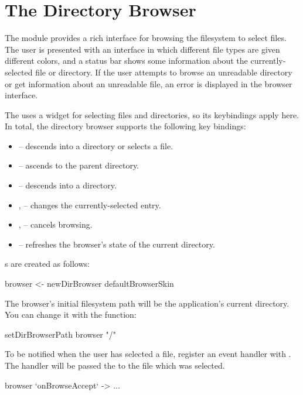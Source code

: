 \section{The Directory Browser}
\label{sec:dirbrowser}

The  module provides a rich interface for browsing the
filesystem to select files.  The user is presented with an interface
in which different file types are given different colors, and a status
bar shows some information about the currently-selected file or
directory.  If the user attempts to browse an unreadable directory or
get information about an unreadable file, an error is displayed in the
browser interface.

The  uses a  widget for selecting files and
directories, so its keybindings apply here.  In total, the directory
browser supports the following key bindings:

\begin{itemize}
\item {} -- descends into a directory or selects a file.
\item {} -- ascends to the parent directory.
\item {} -- descends into a directory.
\item {},  -- changes the currently-selected entry.
\item {},  -- cancels browsing.
\item {} -- refreshes the browser's state of the current
  directory.
\end{itemize}

s are created as follows:

\begin{haskellcode}
 browser <- newDirBrowser defaultBrowserSkin
\end{haskellcode}

The browser's initial filesystem path will be the application's
current directory.  You can change it with the 
function:

\begin{haskellcode}
 setDirBrowserPath browser "/"
\end{haskellcode}

To be notified when the user has selected a file, register an event
handler with .  The handler will be passed the
 to the file which was selected.

\begin{haskellcode}
 browser `onBrowseAccept` \path -> ...
\end{haskellcode}


